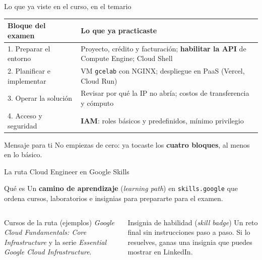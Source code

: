 \documentclass[aspectratio=169,10pt,c]{beamer}
\begin{document}
\begin{frame}{Lo que ya viste en el curso, en el temario}
\renewcommand{\arraystretch}{1.35}
\centering\small
\begin{tabular}{@{}p{4.4cm}p{8.2cm}@{}}
\toprule
\textbf{Bloque del examen} & \textbf{Lo que ya practicaste}\\
\midrule
1. Preparar el entorno & Proyecto, crédito y facturación; \textbf{habilitar la API} de Compute Engine; Cloud Shell\\
2. Planificar e implementar & VM \texttt{gcelab} con NGINX; despliegue en PaaS (Vercel, Cloud Run)\\
3. Operar la solución & Revisar por qué la IP no abría; costos de transferencia y cómputo\\
4. Acceso y seguridad & \textbf{IAM}: roles básicos y predefinidos, mínimo privilegio\\
\bottomrule
\end{tabular}
\par\vspace{4mm}
\begin{exampleblock}{Mensaje para ti}
\small No empiezas de cero: ya tocaste los \textbf{cuatro bloques}, al menos en lo básico.
\end{exampleblock}
\end{frame}

\begin{frame}{La ruta Cloud Engineer en Google Skills}
\begin{block}{Qué es}
\small Un \textbf{camino de aprendizaje} (\emph{learning path}) en \texttt{skills.google} que ordena cursos, laboratorios e insignias para prepararte para el examen.
\end{block}
\begin{center}
\end{center}
\begin{columns}[T,onlytextwidth]
\begin{exampleblock}{Cursos de la ruta (ejemplos)}
\small \emph{Google Cloud Fundamentals: Core Infrastructure} y la serie \emph{Essential Google Cloud Infrastructure}.
\end{exampleblock}
\begin{block}{Insignia de habilidad (\emph{skill badge})}
\small Un reto final sin instrucciones paso a paso. Si lo resuelves, ganas una insignia que puedes mostrar en LinkedIn.
\end{block}
\end{columns}
\end{frame}
\end{document}
